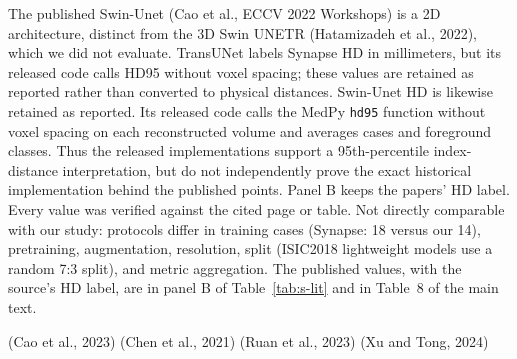 \documentclass[10pt]{article}
\makeatletter
\renewcommand\paragraph{\@startsection{paragraph}{4}{\z@}{1.6ex \@plus .5ex \@minus .2ex}{-1em}{\normalfont\normalsize\bfseries}}
\newcommand{\fitwidth}[1]{\sbox{\fitbox}{#1}\ifdim\wd\fitbox>\linewidth\resizebox{\linewidth}{!}{\usebox{\fitbox}}\else\usebox{\fitbox}\fi}
\makeatother
\begin{document}
\paragraph{Published results.} The published Swin-Unet (Cao et al., ECCV 2022 Workshops) is a 2D architecture, distinct from the 3D Swin UNETR (Hatamizadeh et al., 2022), which we did not evaluate. TransUNet labels Synapse HD in millimeters, but its released code calls HD95 without voxel spacing; these values are retained as reported rather than converted to physical distances. Swin-Unet HD is likewise retained as reported. Its released code calls the MedPy \texttt{hd95} function without voxel spacing on each reconstructed volume and averages cases and foreground classes. Thus the released implementations support a 95th-percentile index-distance interpretation, but do not independently prove the exact historical implementation behind the published points. Panel B keeps the papers' HD label. Every value was verified against the cited page or table. Not directly comparable with our study: protocols differ in training cases (Synapse: 18 versus our 14), pretraining, augmentation, resolution, split (ISIC2018 lightweight models use a random 7:3 split), and metric aggregation. The published values, with the source's HD label, are in panel B of Table~\ref{tab:s-lit} and in Table~8 of the main text.
\begin{table}[!htbp]\centering
{\small\setlength{\tabcolsep}{4pt}%
\expandafter\def\csname supcite@Cao2022SwinUnet\endcsname{(Cao et al., 2023)}%
\expandafter\def\csname supcite@Chen2021TransUNetArxiv\endcsname{(Chen et al., 2021)}%
\expandafter\def\csname supcite@Ruan2023EGEUNet\endcsname{(Ruan et al., 2023)}%
\expandafter\def\csname supcite@Xu2024LBUNet\endcsname{(Xu and Tong, 2024)}%
\def\citep#1{\csname supcite@#1\endcsname}%
\fitwidth{}}
\caption{\label{tab:s-lit}Matched experiments and published context; the main text gives the matched panel for seven models (Table~4 of the main text) and repeats panel B as its Table~8; the adapted LB-UNet is reported only here. A: the same six matched-protocol models on each dataset (Decoder-only: D; BDS-Lite (full): D+F+G+S); mean $\pm$ sample SD of per-run image/slice class-macro scores, seeds 1--3; distances average defined pairs only. B: published DSC converted to 0--1; dashes mean not reported. $^\dagger$Source-reported HD retains its label; released code uses a volume-level 95th percentile without spacing, distinct from A's 2D pixel HD95. Published ISIC2018 references use a random 7:3 split, $256\times256$ inputs, augmentation and pixel-pooled DSC; published ACDC and Synapse scores are volume-level with ImageNet pretraining and other training and split protocols (Synapse: 18 training cases versus our 14). Different data partitions, training and metric aggregation prevent a ranking across the two panels.}
\end{table}
\end{document}
